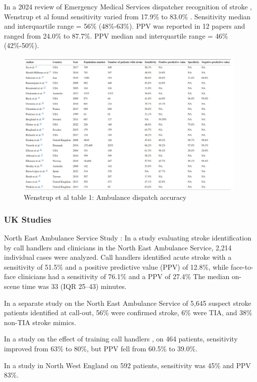 In a 2024 review of Emergency Medical Services dispatcher recognition of stroke \cite{wenstrup_emergency_2024}, Wenstrup et al found sensitivity varied from 17.9\% to 83.0\% . Sensitivity median and interquartile range = 56\% (48\%-63\%). PPV was reported in 12 papers and ranged from 24.0\% to 87.7\%. PPV median and interquartile range = 46\% (42\%-50\%).

\begin{figure}
    \centering
    \includegraphics[width=0.75\linewidth]{images_background/wenstrup.png}
    \caption{Wenstrup et al table 1: Ambulance dispatch accuracy}
    \label{fig:wenstrup}
\end{figure}

\subsubsection{UK Studies}

North East Ambulance Service Study \cite{mcclelland_ambulance_2021}: In a study evaluating stroke identification by call handlers and clinicians in the North East Ambulance Service, 2,214 individual cases were analyzed. Call handlers identified acute stroke with a sensitivity of 51.5\% and a positive predictive value (PPV) of 12.8\%, while face-to-face clinicians had a sensitivity of 76.1\% and a PPV of 27.4\% The median on-scene time was 33 (IQR 25–43) minutes.

In a separate study on the North East Ambulance Service \cite{mcclelland_positive_2020} of 5,645 suspect stroke patients identified at call-out, 56\% were confirmed stroke, 6\% were TIA, and 38\% non-TIA stroke mimics.

In a study on the effect of training call handlers \cite{watkins_training_2013}, on 464 patients, sensitivity improved from 63\% to 80\%, but PPV fell from 60.5\% to 39.0\%. 

In a study in North West England \cite{jones_identification_2013} on 592 patients, sensitivity was 45\% and PPV 83\%.

